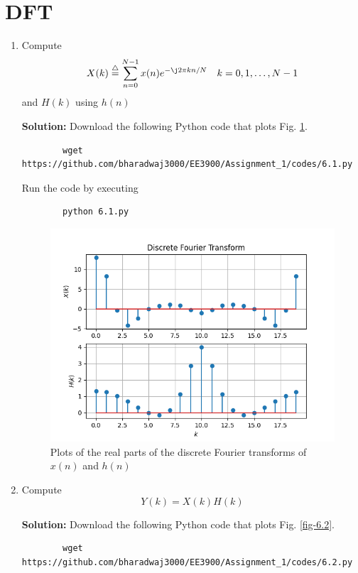 \documentclass[journal,12pt,twocolumn]{IEEEtran}
\newcommand{\solution}{\noindent \textbf{Solution: }}
\numberwithin{equation}{section}
\renewcommand\thesection{\arabic{section}}
\newcommand{\define}{\stackrel{\triangle}{=}}
\begin{document}
	\section{DFT}
	\begin{enumerate}[label=\thesection.\arabic*]
	\item Compute
	\begin{equation}
		X(k) \define \sum _{n=0}^{N-1}x(n) e^{-\j2\pi kn/N} \quad k = 0,1,\dots, N-1
	\end{equation}
	and $H(k)$ using $h(n)$
	
	\solution Download the following Python code that plots Fig. \ref{fig-6.1}.
	\begin{lstlisting}
		wget https://github.com/bharadwaj3000/EE3900/Assignment_1/codes/6.1.py
	\end{lstlisting}
	
	Run the code by executing
	\begin{lstlisting}
		python 6.1.py
	\end{lstlisting}

	\begin{figure}[!ht]
		\centering
		\includegraphics[width=\columnwidth]{./figs/6.1.png}
		\caption{Plots of the real parts of the discrete Fourier transforms of $x(n)$ and $h(n)$}
		\label{fig-6.1}	
	\end{figure}
	
	\item Compute 
	\begin{equation}
		Y(k) = X(k)H(k)
	\end{equation}
	
	\solution Download the following Python code that plots Fig. \ref{fig-6.2}.
	\begin{lstlisting}
		wget https://github.com/bharadwaj3000/EE3900/Assignment_1/codes/6.2.py
	\end{lstlisting}
	

\end{enumerate}
\end{document}
